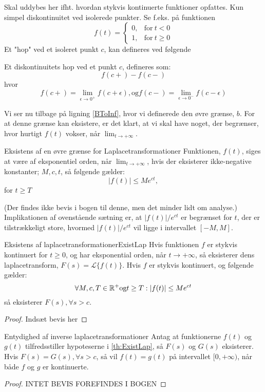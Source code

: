 Skal uddybes her ifht. hvordan stykvis kontinuerte funktioner opfattes. Kun simpel diskontinuitet ved isolerede punkter. Se f.eks. på funktionen   \begin{equation}
    f(t)=
    \begin{cases}
      0, & \text{for}\ t < 0 \\
      1, & \text{for}\ t \geq 0
    \end{cases}
  \end{equation}
Et "hop" ved et isoleret punkt $c$, kan defineres ved følgende

\begin{definition}
Et diskontinuitets hop ved et punkt $c$, defineres som:
$$f(c+) - f(c-)$$
hvor
$$f(c+) = \lim_{\epsilon\to 0^+} f(c + \epsilon), \text{og} f(c-) = \lim_{\epsilon\to 0^-} f(c - \epsilon)$$
\end{definition}

Vi ser nu tilbage på ligning \ref{BToInf}, hvor vi definerede den øvre grænse, $b$. For at denne grænse kan eksistere, er det klart, at vi skal have noget, der begrænser, hvor hurtigt $f(t)$ vokser, når $\lim_{t\to+\infty}$.

\begin{mytheo}{Eksistens af en øvre grænse for Laplacetransformationer}{}
Funktionen, $f(t)$, siges at være af eksponentiel orden, når $\lim_{t\to+\infty}$, hvis der eksisterer ikke-negative konstanter; $M, c, t$, så følgende gælder:
$$ |f(t)| \leq Me^{ct},$$
for $t \geq T$
\end{mytheo}
(Der findes ikke bevis i bogen til denne, men det minder lidt om analyse.)
Implikationen af ovenstående sætning er, at $|f(t)| / e^{ct}$ er begrænset for $t$, der er tilstrækkeligt store, hvormed $|f(t)| / e^{ct}$ vil ligge i intervallet $[-M, M]$.

\begin{mytheo}{Eksistens af laplacetransformationer}{ExistLap}
Hvis funktionen $f$ er stykvis kontinuert for $t \geq 0$, og har eksponential orden, når $t \to +\infty$, så eksisterer dens laplacetransform, $F(s) = \mathcal{L}\{f(t)\}$. Hvis $f$ er stykvis kontinuert, og følgende gælder:
$$\forall M,c,T \in \mathbb{R}^+ \textnormal{og} t \geq T: |f(t)| \leq Me^{ct}$$
så eksisterer $F(s), \forall s > c$.
\end{mytheo}
\begin{proof}
Indsæt bevis her
\end{proof}

\begin{mytheo}{Entydighed af inverse laplacetransformationer}{}
Antag at funktionerne $f(t)$ og $g(t)$ tilfredsstiller hypoteserne i \ref{th:ExistLap}, så $F(s)$ og $G(s)$ eksisterer. Hvis $F(s) = G(s), \forall s > c$, så vil $f(t) = g(t)$ på intervallet $[0,+\infty)$, når både $f$ og $g$ er kontinuerte.
\end{mytheo}
\begin{proof}
INTET BEVIS FOREFINDES I BOGEN
\end{proof}